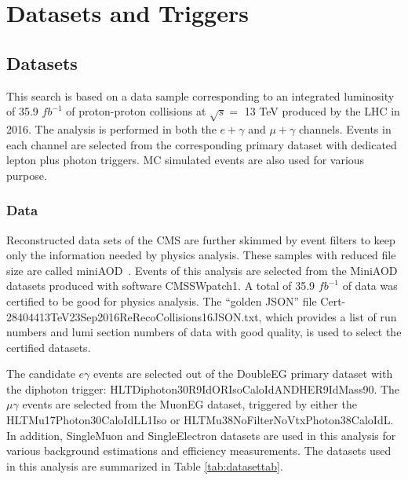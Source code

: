 \documentclass[thesis.tex]{subfiles}
\renewcommand\_{\textunderscore\allowbreak}
\begin{document}
\chapter{Datasets and Triggers}
\label{ch4}

\section{Datasets}
\label{sec:dataandsimulation}
This search is based on a data sample corresponding to an integrated luminosity of 35.9 $fb^{-1}$ of proton-proton collisions at $\sqrt{s} =$ 13 TeV produced by the LHC in 2016.
The analysis is performed in both the $e + \gamma$ and $\mu + \gamma$ channels. 
Events in each channel  are selected from the corresponding primary dataset with dedicated lepton plus photon triggers.
MC simulated events are also used for various purpose.  

\subsection{Data}
Reconstructed data sets of the CMS are further skimmed by event filters to keep only the information needed by physics analysis. 
These samples with reduced file size are called miniAOD~\cite{miniAOD}. 
Events of this analysis are selected from the MiniAOD datasets produced with software CMSSW\_8\_0\_26\_patch1.
A total of 35.9 $fb^{-1}$ of data was certified to be good for physics analysis. The ``golden JSON'' file 
Cert\_271036-284044\_13TeV\_23Sep2016ReReco\_Collisions16\_JSON.txt, which provides a list of run numbers and lumi section numbers of data with good quality, is used to select the certified datasets. 

The candidate $e\gamma$ events are selected out of the DoubleEG primary dataset with the diphoton trigger: HLT\_Diphoton30\_18\_R9Id\_OR\_IsoCaloId\_AND\_HE\_R9Id\_Mass90. 
The $\mu\gamma$ events are selected from the MuonEG dataset, triggered by either the HLT\_Mu17\_Photon30\_CaloIdL\_L1Iso or HLT\_Mu38NoFilterNoVtx\_Photon38\_CaloIdL. 
In addition, SingleMuon and SingleElectron datasets are used in this analysis for various background estimations and efficiency measurements. 
The datasets used in this analysis are summarized in Table \ref{tab:datasettab}. \\
\end{document}
